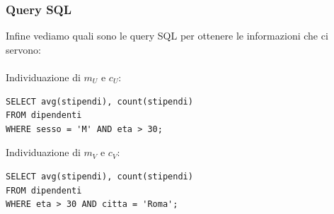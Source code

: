 \subsubsection{Query SQL}
Infine vediamo quali sono le query  SQL per ottenere le informazioni che ci servono:\\ \\
Individuazione di $m_{U}$ e $c_{U}$:
\begin{lstlisting}
SELECT avg(stipendi), count(stipendi) 
FROM dipendenti 
WHERE sesso = 'M' AND eta > 30;
\end{lstlisting}
Individuazione di $m_{V}$ e $c_{V}$:
\begin{lstlisting}
SELECT avg(stipendi), count(stipendi) 
FROM dipendenti 
WHERE eta > 30 AND citta = 'Roma';
\end{lstlisting}



